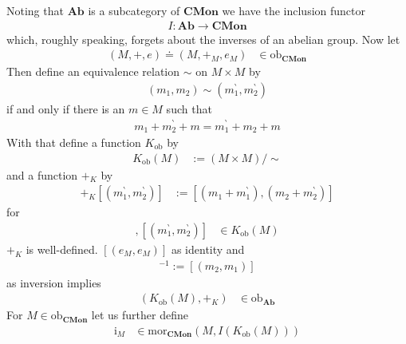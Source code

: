 \begin{exa}
\label{exa:grothengr}
Noting that $\mathbf{Ab}$ is a subcategory of $\mathbf{CMon}$ we have the inclusion functor
\begin{align*}
  I
  \colon
  \mathbf{Ab}
  \rightarrow
  \mathbf{CMon}
\end{align*}
which, roughly speaking, forgets about the inverses of an abelian group. Now let
\begin{align*}
  (M,+,e)
  \doteq
  (M,+_{M},e_{M})
  &\in
  \mathrm{ob}_{\mathbf{CMon}}
\end{align*}
Then define an equivalence relation $\sim$ on $M \times M$ by
\begin{align*}
  (m_{1},m_{2})
  \sim
  (m_{1}^{\backprime},m_{2}^{\backprime})
\end{align*}
if and only if there is an $m \in M$ such that
\begin{align*}
  m_{1}
  +
  m_{2}^{\backprime}
  +
  m
  =
  m_{1}^{\backprime}
  +
  m_{2}
  +
  m
\end{align*}
With that define a function $K_{\mathrm{ob}}$ by
\begin{align*}
  K_{\mathrm{ob}}(M) 
  &:=
  (M \times M)
  \slash
  \sim
\end{align*}
and a function $+_{K}$ by
\begin{align*}
  [(m_{1},m_{2})]
  +_{K}
  \left[
    (m_{1}^{\backprime},m_{2}^{\backprime})
  \right]
  &:=
  \left[
    \left(
      m_{1}
      +
      m_{1}^{\backprime}
    \right),
    \left(
      m_{2}
      +
      m_{2}^{\backprime}
    \right)
  \right]
\end{align*}
for
\begin{align*}
  [(m_{1},m_{2})],
  \left[
    (m_{1}^{\backprime},m_{2}^{\backprime})
  \right]
  &\in
  K_{\mathrm{ob}}(M)
\end{align*}
$+_{K}$ is well-defined. $[(e_{M},e_{M})]$ as identity and
\begin{align*}
  [(m_{1},m_{2})]^{-1}
  :=
  [(m_{2},m_{1})]
\end{align*}
as inversion implies
\begin{align*}
  \left(
    K_{\mathrm{ob}}(M),
    +_{K}
  \right)
  &\in
  \mathrm{ob}_{\mathbf{Ab}}
\end{align*}
For $M \in \mathrm{ob}_{\mathbf{CMon}}$ let us further define
\begin{align*}
  \mathrm{i}_{M}
  &\in
  \mathrm{mor}_{\mathbf{CMon}}
  \left(
    M,
    I(K_{\textrm{ob}}(M))
  \right)
\end{align*}

\end{exa}

